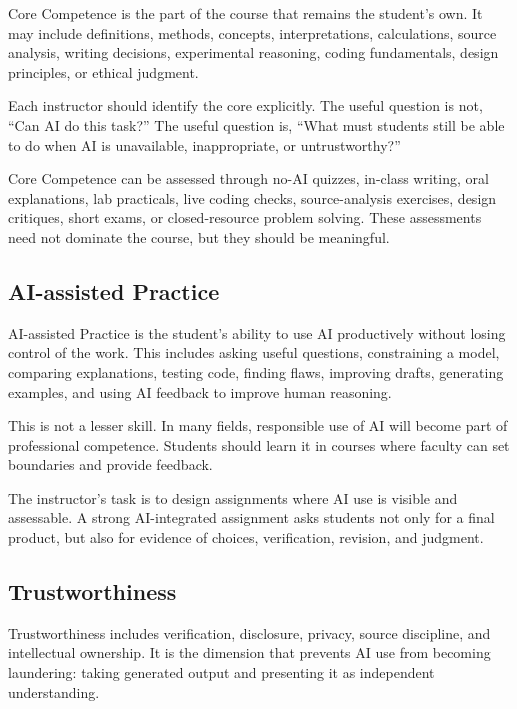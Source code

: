 \documentclass{SIAMbook2023}
\begin{document}
Core Competence is the part of the course that remains the student's own. It may include definitions, methods, concepts, interpretations, calculations, source analysis, writing decisions, experimental reasoning, coding fundamentals, design principles, or ethical judgment.

Each instructor should identify the core explicitly. The useful question is not, ``Can AI do this task?'' The useful question is, ``What must students still be able to do when AI is unavailable, inappropriate, or untrustworthy?''

Core Competence can be assessed through no-AI quizzes, in-class writing, oral explanations, lab practicals, live coding checks, source-analysis exercises, design critiques, short exams, or closed-resource problem solving. These assessments need not dominate the course, but they should be meaningful.

\subsection{AI-assisted Practice}
\label{i:subsec:ai-augmented-practice}

AI-assisted Practice is the student's ability to use AI productively without losing control of the work. This includes asking useful questions, constraining a model, comparing explanations, testing code, finding flaws, improving drafts, generating examples, and using AI feedback to improve human reasoning.

This is not a lesser skill. In many fields, responsible use of AI will become part of professional competence. Students should learn it in courses where faculty can set boundaries and provide feedback.

The instructor's task is to design assignments where AI use is visible and assessable. A strong AI-integrated assignment asks students not only for a final product, but also for evidence of choices, verification, revision, and judgment.

\subsection{Trustworthiness}
\label{i:subsec:responsible-judgment}

Trustworthiness includes verification, disclosure, privacy, source discipline, and intellectual ownership. It is the dimension that prevents AI use from becoming laundering: taking generated output and presenting it as independent understanding.
\end{document}
